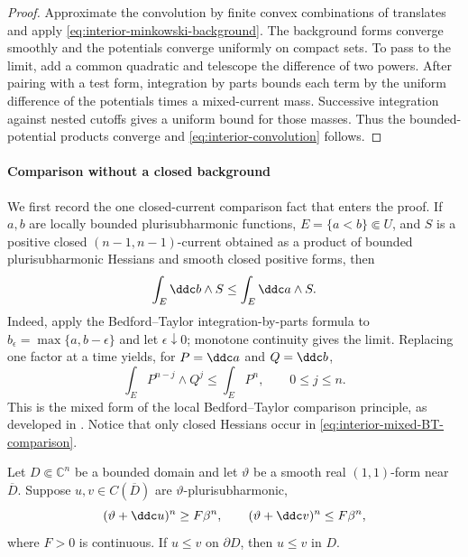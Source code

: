 \begin{proof}
Approximate the convolution by finite convex combinations of translates and apply \eqref{eq:interior-minkowski-background}. The background forms converge smoothly and the potentials converge uniformly on compact sets. To pass to the limit, add a common quadratic and telescope the difference of two powers. After pairing with a test form, integration by parts bounds each term by the uniform difference of the potentials times a mixed-current mass. Successive integration against nested cutoffs gives a uniform bound for those masses. Thus the bounded-potential products converge and \eqref{eq:interior-convolution} follows.
\end{proof}

\paragraph{Comparison without a closed background}

We first record the one closed-current comparison fact that enters the proof. If $a,b$ are locally bounded plurisubharmonic functions, $E=\{a<b\}\Subset U$, and $S$ is a positive closed $(n-1,n-1)$-current obtained as a product of bounded plurisubharmonic Hessians and smooth closed positive forms, then
\begin{equation}\label{eq:interior-mixed-BT-comparison}
  \int_E\ddc b\wedge S\leq\int_E\ddc a\wedge S.
\end{equation}
Indeed, apply the Bedford--Taylor integration-by-parts formula to $b_\epsilon=\max\{a,b-\epsilon\}$ and let $\epsilon\downarrow0$; monotone continuity gives the limit. Replacing one factor at a time yields, for $P=\ddc a$ and $Q=\ddc b$,
\begin{equation}\label{eq:interior-power-comparison}
  \int_E P^{n-j}\wedge Q^j\leq\int_E P^n,
  \qquad 0\leq j\leq n.
\end{equation}
This is the mixed form of the local Bedford--Taylor comparison principle, as developed in \cite{SGPT}. Notice that only closed Hessians occur in \eqref{eq:interior-mixed-BT-comparison}.

\begin{proposition}\label{prop:interior-comparison}
Let $D\Subset\mathbb C^n$ be a bounded domain and let $\vartheta$ be a smooth real $(1,1)$-form near $\overline D$. Suppose $u,v\in C(\overline D)$ are $\vartheta$-plurisubharmonic,
\[
  (\vartheta+\ddc u)^n\geq F\beta^n,
  \qquad
  (\vartheta+\ddc v)^n\leq F\beta^n,
\]
where $F>0$ is continuous. If $u\leq v$ on $\partial D$, then $u\leq v$ in $D$.
\end{proposition}

